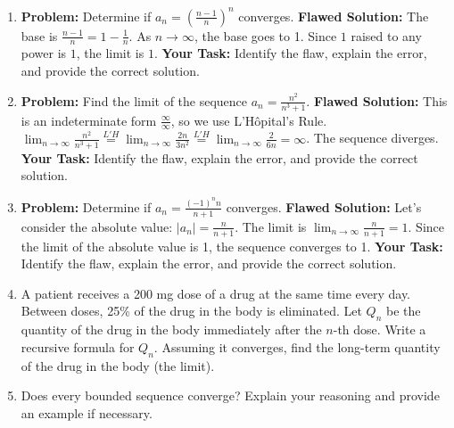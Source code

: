 \documentclass{article}
\begin{document}
\begin{enumerate}
    \item \textbf{Problem:} Determine if $a_n = (\frac{n-1}{n})^n$ converges.
    \textbf{Flawed Solution:} The base is $\frac{n-1}{n} = 1 - \frac{1}{n}$. As $n \to \infty$, the base goes to 1. Since $1$ raised to any power is $1$, the limit is $1$.
    \textbf{Your Task:} Identify the flaw, explain the error, and provide the correct solution.
    
    \item \textbf{Problem:} Find the limit of the sequence $a_n = \frac{n^2}{n^3 + 1}$.
    \textbf{Flawed Solution:} This is an indeterminate form $\frac{\infty}{\infty}$, so we use L'Hôpital's Rule. 
    $\lim_{n\to\infty} \frac{n^2}{n^3 + 1} \overset{L'H}{=} \lim_{n\to\infty} \frac{2n}{3n^2} \overset{L'H}{=} \lim_{n\to\infty} \frac{2}{6n} = \infty$. The sequence diverges.
    \textbf{Your Task:} Identify the flaw, explain the error, and provide the correct solution.

    \item \textbf{Problem:} Determine if $a_n = \frac{(-1)^n n}{n+1}$ converges.
    \textbf{Flawed Solution:} Let's consider the absolute value: $|a_n| = \frac{n}{n+1}$. The limit is $\lim_{n\to\infty} \frac{n}{n+1} = 1$. Since the limit of the absolute value is 1, the sequence converges to 1.
    \textbf{Your Task:} Identify the flaw, explain the error, and provide the correct solution.

    \item A patient receives a 200 mg dose of a drug at the same time every day. Between doses, 25\% of the drug in the body is eliminated. Let $Q_n$ be the quantity of the drug in the body immediately after the $n$-th dose. Write a recursive formula for $Q_n$. Assuming it converges, find the long-term quantity of the drug in the body (the limit).
    \item Does every bounded sequence converge? Explain your reasoning and provide an example if necessary.
\end{enumerate}

\newpage
\end{document}
